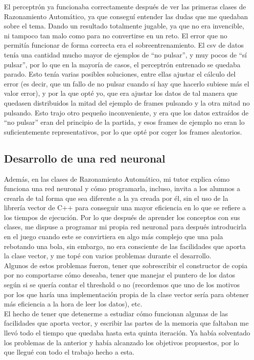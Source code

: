El perceptrón ya funcionaba correctamente después de ver las primeras clases de Razonamiento Automático, ya que conseguí entender las dudas que me quedaban sobre el tema. Dando un resultado totalmente jugable, ya que no era invencible, ni tampoco tan malo como para no convertirse en un reto. El error que no permitía funcionar de forma correcta era el sobreentrenamiento. El \gls{csv} de datos tenía una cantidad mucho mayor de ejemplos de ``no pulsar'', y muy pocos de ``sí pulsar'', por lo que en la mayoría de casos, el perceptrón entrenado se quedaba parado. Esto tenía varias posibles soluciones, entre ellas ajustar el cálculo del error (es decir, que un fallo de no pulsar cuando sí hay que hacerlo subiese más el valor error), y por la que opté yo, que era ajustar los datos de tal manera que quedasen distribuidos la mitad del ejemplo de frames pulsando y la otra mitad no pulsando. Esto trajo otro pequeño inconveniente, y era que los datos extraídos de ``no pulsar'' eran del principio de la partida, y esos frames de ejemplo no eran lo suficientemente representativos, por lo que opté por coger los frames aleatorios.

\subsection{Desarrollo de una red neuronal}
Además, en las clases de Razonamiento Automático, mi tutor explica cómo funciona una red neuronal y cómo programarla, incluso, invita a los alumnos a crearla de tal forma que sea diferente a la ya creada por él, sin el uso de la librería vector de C++ para conseguir una mayor eficiencia en lo que se refiere a los tiempos de ejecución. Por lo que después de aprender los conceptos con sus clases, me dispuse a programar mi propia red neuronal para después introducirla en el juego cuando este se convirtiera en algo más complejo que una pala rebotando una bola, sin embargo, no era consciente de las facilidades que aporta la clase vector, y me topé con varios problemas durante el desarrollo.
\\
Algunos de estos problemas fueron, tener que sobrescribir el constructor de copia por no comportarse cómo deseaba, tener que manejar el puntero de los datos según si se quería contar el threshold o no (recordemos que uno de los motivos por los que haría una implementación propia de la clase vector sería para obtener más eficiencia a la hora de leer los datos), etc.
\\
El hecho de tener que detenerme a estudiar cómo funcionan algunas de las facilidades que aporta vector, y escribir las partes de la memoria que faltaban me llevó todo el tiempo que quedaba hasta esta quinta iteración. Ya había solventado los problemas de la anterior y había alcanzado los objetivos propuestos, por lo que llegué con todo el trabajo hecho a esta.

